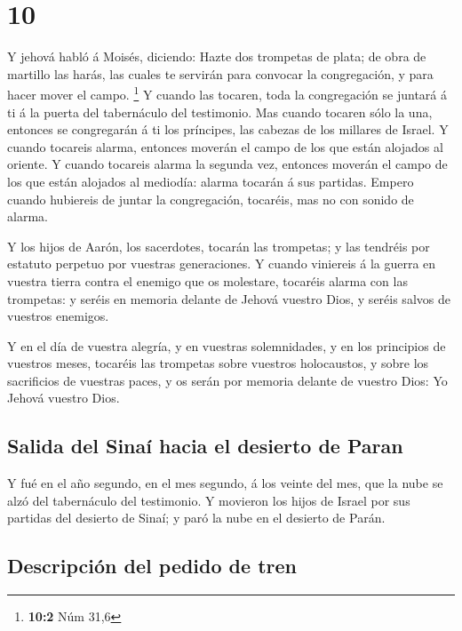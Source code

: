 \hypertarget{section-9}{%
\section{10}\label{section-9}}

 Y jehová habló á Moisés, diciendo:  Hazte dos
trompetas de plata; de obra de martillo las harás, las cuales te
servirán para convocar la congregación, y para hacer mover el campo.
\footnote{\textbf{10:2} Núm 31,6}  Y cuando las tocaren,
toda la congregación se juntará á ti á la puerta del tabernáculo del
testimonio.  Mas cuando tocaren sólo la una, entonces se
congregarán á ti los príncipes, las cabezas de los millares de Israel.
 Y cuando tocareis alarma, entonces moverán el campo de los
que están alojados al oriente.  Y cuando tocareis alarma la
segunda vez, entonces moverán el campo de los que están alojados al
mediodía: alarma tocarán á sus partidas.  Empero cuando
hubiereis de juntar la congregación, tocaréis, mas no con sonido de
alarma.

 Y los hijos de Aarón, los sacerdotes, tocarán las
trompetas; y las tendréis por estatuto perpetuo por vuestras
generaciones.  Y cuando viniereis á la guerra en vuestra
tierra contra el enemigo que os molestare, tocaréis alarma con las
trompetas: y seréis en memoria delante de Jehová vuestro Dios, y seréis
salvos de vuestros enemigos.

 Y en el día de vuestra alegría, y en vuestras
solemnidades, y en los principios de vuestros meses, tocaréis las
trompetas sobre vuestros holocaustos, y sobre los sacrificios de
vuestras paces, y os serán por memoria delante de vuestro Dios: Yo
Jehová vuestro Dios.

\hypertarget{salida-del-sinauxed-hacia-el-desierto-de-paran}{%
\subsection{Salida del Sinaí hacia el desierto de
Paran}\label{salida-del-sinauxed-hacia-el-desierto-de-paran}}

 Y fué en el año segundo, en el mes segundo, á los veinte
del mes, que la nube se alzó del tabernáculo del testimonio.
 Y movieron los hijos de Israel por sus partidas del
desierto de Sinaí; y paró la nube en el desierto de Parán.

\hypertarget{descripciuxf3n-del-pedido-de-tren}{%
\subsection{Descripción del pedido de
tren}\label{descripciuxf3n-del-pedido-de-tren}}


